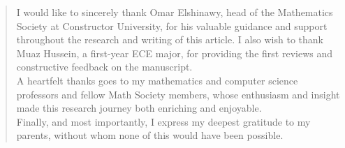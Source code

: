 \thispagestyle{empty}

\vspace*{1cm}

\renewcommand{\abstractname}{\Large Acknowledgements}
\begin{abstract}
    I would like to sincerely thank Omar Elshinawy, head of the Mathematics Society at Constructor University, for his valuable guidance and support throughout the research and writing of this article. I also wish to thank Muaz Hussein, a first-year ECE major, for providing the first reviews and constructive feedback on the manuscript.\\
A heartfelt thanks goes to my mathematics and computer science professors and fellow Math Society members, whose enthusiasm and insight made this research journey both enriching and enjoyable.\\
Finally, and most importantly, I express my deepest gratitude to my parents, without whom none of this would have been possible.
\end{abstract}
